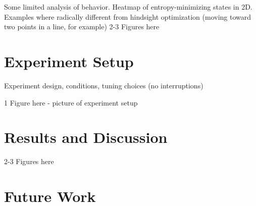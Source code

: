 \documentclass[conference]{IEEEtran}
\begin{document}
Some limited analysis of behavior. Heatmap of entropy-minimizing states in 2D. Examples where radically different from hindsight optimization (moving toward two points in a line, for example)
2-3 Figures here

\section{Experiment Setup}

Experiment design, conditions, tuning choices (no interruptions)

1 Figure here - picture of experiment setup

\section{Results and Discussion}
2-3 Figures here

\section{Future Work}



\end{document}
